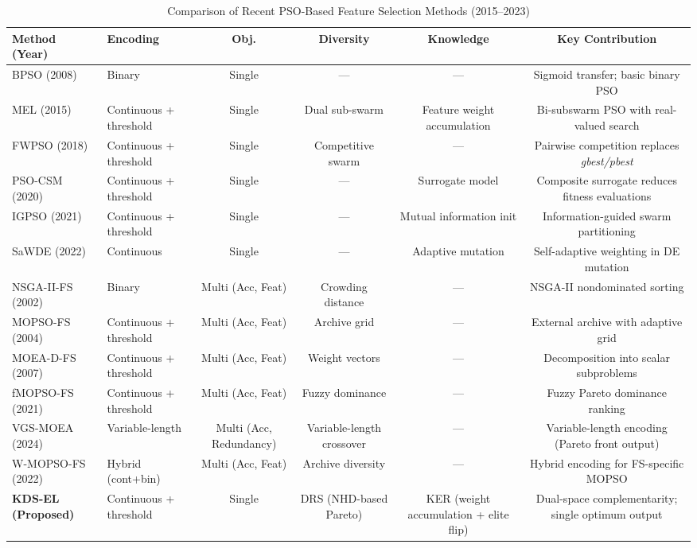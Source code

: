 \begin{table}[htbp]
\centering
\caption{Comparison of Recent PSO-Based Feature Selection Methods (2015--2023)}
\label{tab:lit_comparison}
\small
\renewcommand{\arraystretch}{1.15}
\begin{tabular}{lp{2.5cm}cccc}
\toprule
Method (Year) & Encoding & Obj. & Diversity & Knowledge & Key Contribution \\
\midrule
BPSO (2008) \cite{kennedy1997} & Binary & Single & — & — & Sigmoid transfer; basic binary PSO \\
MEL (2015) \cite{lu2015} & Continuous + threshold & Single & Dual sub-swarm & Feature weight accumulation & Bi-subswarm PSO with real-valued search \\
FWPSO (2018) \cite{gu2018} & Continuous + threshold & Single & Competitive swarm & — & Pairwise competition replaces \textit{gbest/pbest} \\
PSO-CSM (2020) \cite{song2020} & Continuous + threshold & Single & — & Surrogate model & Composite surrogate reduces fitness evaluations \\
IGPSO (2021) \cite{gu2021} & Continuous + threshold & Single & — & Mutual information init & Information-guided swarm partitioning \\
SaWDE (2022) \cite{wang2022} & Continuous & Single & — & Adaptive mutation & Self-adaptive weighting in DE mutation \\
\midrule
NSGA-II-FS (2002) \cite{deb2002} & Binary & Multi (Acc, Feat) & Crowding distance & — & NSGA-II nondominated sorting \\
MOPSO-FS (2004) \cite{coello2004} & Continuous + threshold & Multi (Acc, Feat) & Archive grid & — & External archive with adaptive grid \\
MOEA-D-FS (2007) \cite{zhang2007} & Continuous + threshold & Multi (Acc, Feat) & Weight vectors & — & Decomposition into scalar subproblems \\
fMOPSO-FS (2021) \cite{wang2021} & Continuous + threshold & Multi (Acc, Feat) & Fuzzy dominance & — & Fuzzy Pareto dominance ranking \\
VGS-MOEA (2024) \cite{li2024} & Variable-length & Multi (Acc, Redundancy) & Variable-length crossover & — & Variable-length encoding (Pareto front output) \\
W-MOPSO-FS (2022) \cite{nguyen2022} & Hybrid (cont+bin) & Multi (Acc, Feat) & Archive diversity & — & Hybrid encoding for FS-specific MOPSO \\
\midrule
\textbf{KDS-EL (Proposed)} & Continuous + threshold & Single & DRS (NHD-based Pareto) & KER (weight accumulation + elite flip) & Dual-space complementarity; single optimum output \\
\bottomrule
\end{tabular}
\end{table}
